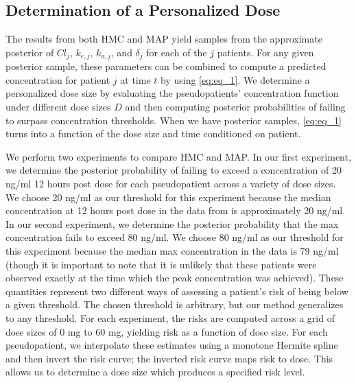 \subsection*{Determination of a Personalized Dose}

The results from both  HMC and MAP yield samples from the approximate posterior of $\mathit{Cl}_{j}$, $k_{e,j}$, $k_{a,j}$, and $\delta_j$ for each of the $j$ patients.  For any given posterior sample, these parameters can be combined to compute a predicted concentration for patient $j$ at time $t$ by using \cref{eq:eq_1}.   We determine a personalized dose size by evaluating the pseudopatients’ concentration function under different dose sizes $D$ and then computing posterior probabilities of failing to surpass concentration thresholds.  When we have posterior samples, \cref{eq:eq_1} turns into a function of the dose size and time conditioned on patient. 


We perform two experiments to compare HMC and MAP.  In our first experiment, we determine the posterior probability of failing to exceed a concentration of 20 ng/ml 12 hours post dose for each pseudopatient across a variety of dose sizes. We choose 20 ng/ml as our threshold for this experiment because the median concentration at 12 hours post dose  in the data from \cite{Beaton2018-el} is approximately 20 ng/ml. In our second experiment, we determine the posterior probability that the max concentration fails to exceed 80 ng/ml.  We choose 80 ng/ml as our threshold for this experiment because the median max concentration in the data is 79 ng/ml (though it is important to note that it is unlikely that these patients were observed exactly at the time which the peak concentration was achieved).  These quantities represent two different ways of assessing a patient's risk of being below a given threshold.  The chosen threshold is arbitrary, but our method generalizes to any threshold.  For each experiment, the risks are computed across a grid of dose sizes of 0 mg to 60 mg, yielding risk as a function of dose size.  For each pseudopatient, we interpolate these estimates using a monotone Hermite spline and then invert the risk curve; the inverted risk curve maps risk to dose. This allows us to determine a dose size which produces a specified risk level.


